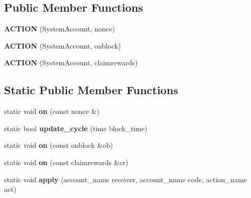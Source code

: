 \subsection*{Public Member Functions}
\begin{DoxyCompactItemize}
\item 
\mbox{\label{classaaciosystem_1_1contract_a33105094f47882ba3e3dd0ca230af1b2}} 
{\bfseries A\+C\+T\+I\+ON} (System\+Account, nonce)
\item 
\mbox{\label{classaaciosystem_1_1contract_a1da526ef0ae875cd830ac7153bd78fe8}} 
{\bfseries A\+C\+T\+I\+ON} (System\+Account, onblock)
\item 
\mbox{\label{classaaciosystem_1_1contract_ad4d87c1fc46fda68009745d898428c5e}} 
{\bfseries A\+C\+T\+I\+ON} (System\+Account, claimrewards)
\end{DoxyCompactItemize}
\subsection*{Static Public Member Functions}
\begin{DoxyCompactItemize}
\item 
\mbox{\label{classaaciosystem_1_1contract_a2d69d9c7a586eb4098ce39d674509928}} 
static void {\bfseries on} (const nonce \&)
\item 
\mbox{\label{classaaciosystem_1_1contract_abf9aaee007e56ae8458ef962168cd6d8}} 
static bool {\bfseries update\+\_\+cycle} (time block\+\_\+time)
\item 
\mbox{\label{classaaciosystem_1_1contract_a7130b2953975cf614cc143744c548d1b}} 
static void {\bfseries on} (const onblock \&ob)
\item 
\mbox{\label{classaaciosystem_1_1contract_a8f7cdec87245e831d88fd80f8c4da35e}} 
static void {\bfseries on} (const claimrewards \&cr)
\item 
\mbox{\label{classaaciosystem_1_1contract_a24883aaaab08723f2375113fbc415add}} 
static void {\bfseries apply} (account\+\_\+name receiver, account\+\_\+name code, action\+\_\+name act)
\end{DoxyCompactItemize}
